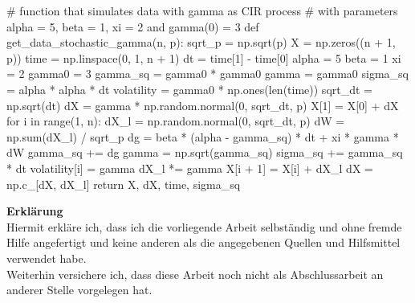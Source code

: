 \documentclass[a4paper,11pt]{book}
\theoremstyle{plain}
\theoremstyle{definition}
\begin{document}
\begin{python}
# function that simulates data with gamma as CIR process
# with parameters alpha = 5, beta = 1, xi = 2 and gamma(0) = 3   
def get_data_stochastic_gamma(n, p):
    sqrt_p = np.sqrt(p)
    X = np.zeros((n + 1, p))
    time = np.linspace(0, 1, n + 1)
    dt = time[1] - time[0]
    alpha = 5
    beta = 1
    xi = 2
    gamma0 = 3
    gamma_sq = gamma0 * gamma0
    gamma = gamma0
    sigma_sq = alpha * alpha * dt
    volatility = gamma0 * np.ones(len(time))
    sqrt_dt = np.sqrt(dt)
    dX = gamma * np.random.normal(0, sqrt_dt, p)
    X[1] = X[0] + dX
    for i in range(1, n):
        dX_l = np.random.normal(0, sqrt_dt, p)
        dW = np.sum(dX_l) / sqrt_p
        dg = beta * (alpha - gamma_sq) * dt + xi * gamma * dW
        gamma_sq += dg
        gamma = np.sqrt(gamma_sq)
        sigma_sq += gamma_sq * dt
        volatility[i] = gamma
        dX_l *= gamma
        X[i + 1] = X[i] + dX_l
        dX = np.c_[dX, dX_l]
    return X, dX, time, sigma_sq
    
\end{python}
    	
   	
   	
   	
   	\newpage
   	\thispagestyle{empty}
   	\large
   	\textbf{Erkl\"arung} \\
   	
   	Hiermit erkl\"are ich, dass ich die vorliegende Arbeit selbst\"andig und ohne fremde Hilfe angefertigt und keine anderen als die angegebenen Quellen und Hilfsmittel verwendet habe. \\
   	
   	Weiterhin versichere ich, dass diese Arbeit noch nicht als Abschlussarbeit an anderer Stelle vorgelegen hat. \\
\end{document}
